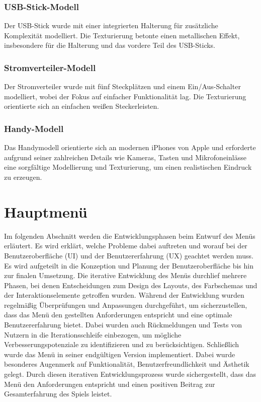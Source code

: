 \subsubsection*{USB-Stick-Modell}
Der USB-Stick wurde mit einer integrierten Halterung für zusätzliche Komplexität modelliert. Die Texturierung betonte einen metallischen Effekt, insbesondere für die Halterung und das vordere Teil des USB-Sticks.

\subsubsection*{Stromverteiler-Modell}
Der Stromverteiler wurde mit fünf Steckplätzen und einem Ein/Aus-Schalter modelliert, wobei der Fokus auf einfacher Funktionalität lag. Die Texturierung orientierte sich an einfachen weißen Steckerleisten.

\subsubsection*{Handy-Modell}
Das Handymodell orientierte sich an modernen iPhones von Apple und erforderte aufgrund seiner zahlreichen Details wie Kameras, Tasten und Mikrofoneinlässe eine sorgfältige Modellierung und Texturierung, um einen realistischen Eindruck zu erzeugen.


\section{Hauptmenü}
Im folgenden Abschnitt werden die Entwicklungsphasen beim Entwurf des Menüs erläutert. Es wird erklärt, welche Probleme dabei auftreten und worauf bei der Benutzeroberfläche (UI) und der Benutzererfahrung (UX) geachtet werden muss.
Es wird aufgeteilt in die Konzeption und Planung der Benutzeroberfläche bis hin zur finalen Umsetzung. Die iterative Entwicklung des Menüs durchlief mehrere Phasen, bei denen Entscheidungen zum Design des Layouts, des Farbschemas und der Interaktionselemente getroffen wurden.
Während der Entwicklung wurden regelmäßig Überprüfungen und Anpassungen durchgeführt, um sicherzustellen, dass das Menü den gestellten Anforderungen entspricht und eine optimale Benutzererfahrung bietet. Dabei wurden auch Rückmeldungen und Tests von Nutzern in die Iterationsschleife einbezogen, um mögliche Verbesserungspotenziale zu identifizieren und zu berücksichtigen.
Schließlich wurde das Menü in seiner endgültigen Version implementiert. Dabei wurde besonderes Augenmerk auf Funktionalität, Benutzerfreundlichkeit und Ästhetik gelegt. Durch diesen iterativen Entwicklungsprozess wurde sichergestellt, dass das Menü den Anforderungen entspricht und einen positiven Beitrag zur Gesamterfahrung des Spiels leistet.


